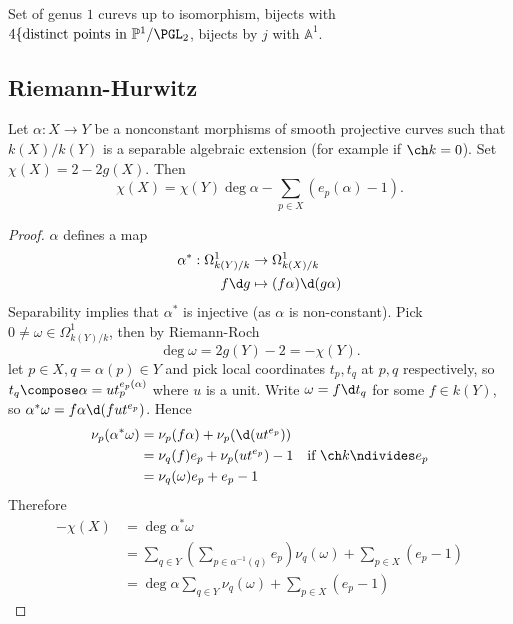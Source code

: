 \documentclass[a4paper]{article}
\renewcommand{\A}{\mathbb{A}}
\renewcommand*{\P}{\mathbb{P}}
\begin{document}
\begin{corollary}
  Set of genus \(1\) curevs up to isomorphism, bijects with \(4 \{\text{distinct points in } \P^1/\PGL_2\), bijects by \(j\) with \(\A^1\).
\end{corollary}

\subsection{Riemann-Hurwitz}

\begin{theorem}
  Let \(\alpha: X \to Y\) be a nonconstant morphisms of smooth projective curves such that \(k(X)/k(Y)\) is a separable algebraic extension (for example if \(\ch k = 0\)). Set \(\chi(X) = 2 - 2g(X)\). Then
  \[
    \chi(X) = \chi(Y) \deg \alpha - \sum_{p \in X} (e_p(\alpha) - 1).
  \]
\end{theorem}

\begin{proof}
  \(\alpha\) defines a map
  \begin{align*}
    \alpha^*: \Omega^1_{k(Y)/k} &\to \Omega^1_{k(X)/k} \\
    f \d g &\mapsto (f \alpha) \d (g\alpha)
  \end{align*}
  Separability implies that \(\alpha^*\) is injective (as \(\alpha\) is non-constant). Pick \(0 \neq \omega \in \Omega^1_{k(Y)/k}\), then by Riemann-Roch
  \[
    \deg \omega = 2 g(Y) - 2 = - \chi(Y).
  \]
  let \(p \in X, q = \alpha(p) \in Y\) and pick local coordinates \(t_p, t_q\) at \(p, q\) respectively, so \(t_q \compose \alpha = u t_p^{e_p(\alpha)}\) where \(u\) is a unit. Write \(\omega = f \d t_q\) for some \(f \in k(Y)\), so \(\alpha^* \omega = f \alpha \d (f u t^{e_p})\). Hence
  \begin{align*}
    \nu_p(\alpha^* \omega)
    &= \nu_p(f \alpha) + \nu_p(\d (ut^{e_p})) \\
    &= \nu_q(f) e_p + \nu_p(u t^{e_p}) - 1 \quad \text{if } \ch k \ndivides e_p \\
    &= \nu_q(\omega) e_p + e_p - 1
  \end{align*}
  Therefore
  \begin{align*}
    -\chi(X)
    &= \deg \alpha^* \omega \\
    &= \sum_{q \in Y} (\sum_{p \in \alpha^{-1}(q)} e_p) \nu_q(\omega) + \sum_{p \in X} (e_p - 1) \\
    &= \deg \alpha \sum_{q \in Y} \nu_q(\omega) + \sum_{p \in X} (e_p - 1)
  \end{align*}
\end{proof}
\end{document}
